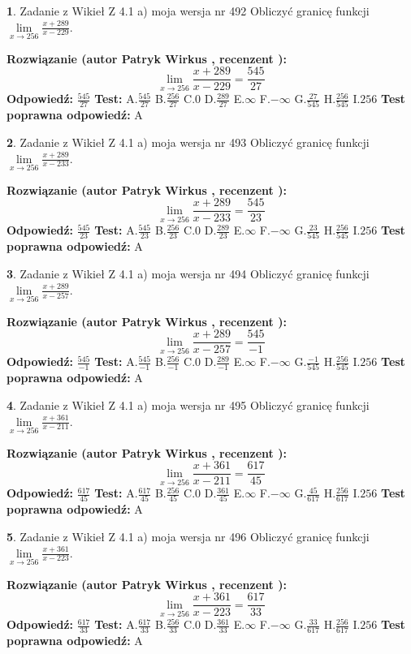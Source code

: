\documentclass[12pt, a4paper]{article}
\theoremstyle{definition} %
\newtheorem{zad}{}
\newcommand{\zadStart}[1]{\begin{zad}#1\newline}
\newcommand{\zadStop}{\end{zad}}
\newcommand{\rozwStart}[2]{\noindent \textbf{Rozwiązanie (autor #1 , recenzent #2): }\newline}
\newcommand{\rozwStop}{\newline}
\newcommand{\odpStart}{\noindent \textbf{Odpowiedź:}\newline}
\newcommand{\odpStop}{\newline}
\newcommand{\testStart}{\noindent \textbf{Test:}\newline}
\newcommand{\testStop}{\newline}
\newcommand{\kluczStart}{\noindent \textbf{Test poprawna odpowiedź:}\newline}
\newcommand{\kluczStop}{\newline}
\begin{document}
\zadStart{Zadanie z Wikieł Z 4.1 a) moja wersja nr 492}
Obliczyć granicę funkcji $\lim\limits_{x\to256}\frac{x+289}{x-229}$.
\zadStop
\rozwStart{Patryk Wirkus}{}
$$\lim\limits_{x\to256}\frac{x+289}{x-229} = \frac{545}{27}$$
\rozwStop
\odpStart
$\frac{545}{27}$
\odpStop
\testStart
A.$\frac{545}{27}$
B.$\frac{256}{27}$
C.$0$
D.$\frac{289}{27}$
E.$\infty$
F.$-\infty$
G.$\frac{27}{545}$
H.$\frac{256}{545}$
I.$256$
\testStop
\kluczStart
A
\kluczStop



\zadStart{Zadanie z Wikieł Z 4.1 a) moja wersja nr 493}
Obliczyć granicę funkcji $\lim\limits_{x\to256}\frac{x+289}{x-233}$.
\zadStop
\rozwStart{Patryk Wirkus}{}
$$\lim\limits_{x\to256}\frac{x+289}{x-233} = \frac{545}{23}$$
\rozwStop
\odpStart
$\frac{545}{23}$
\odpStop
\testStart
A.$\frac{545}{23}$
B.$\frac{256}{23}$
C.$0$
D.$\frac{289}{23}$
E.$\infty$
F.$-\infty$
G.$\frac{23}{545}$
H.$\frac{256}{545}$
I.$256$
\testStop
\kluczStart
A
\kluczStop



\zadStart{Zadanie z Wikieł Z 4.1 a) moja wersja nr 494}
Obliczyć granicę funkcji $\lim\limits_{x\to256}\frac{x+289}{x-257}$.
\zadStop
\rozwStart{Patryk Wirkus}{}
$$\lim\limits_{x\to256}\frac{x+289}{x-257} = \frac{545}{-1}$$
\rozwStop
\odpStart
$\frac{545}{-1}$
\odpStop
\testStart
A.$\frac{545}{-1}$
B.$\frac{256}{-1}$
C.$0$
D.$\frac{289}{-1}$
E.$\infty$
F.$-\infty$
G.$\frac{-1}{545}$
H.$\frac{256}{545}$
I.$256$
\testStop
\kluczStart
A
\kluczStop



\zadStart{Zadanie z Wikieł Z 4.1 a) moja wersja nr 495}
Obliczyć granicę funkcji $\lim\limits_{x\to256}\frac{x+361}{x-211}$.
\zadStop
\rozwStart{Patryk Wirkus}{}
$$\lim\limits_{x\to256}\frac{x+361}{x-211} = \frac{617}{45}$$
\rozwStop
\odpStart
$\frac{617}{45}$
\odpStop
\testStart
A.$\frac{617}{45}$
B.$\frac{256}{45}$
C.$0$
D.$\frac{361}{45}$
E.$\infty$
F.$-\infty$
G.$\frac{45}{617}$
H.$\frac{256}{617}$
I.$256$
\testStop
\kluczStart
A
\kluczStop



\zadStart{Zadanie z Wikieł Z 4.1 a) moja wersja nr 496}
Obliczyć granicę funkcji $\lim\limits_{x\to256}\frac{x+361}{x-223}$.
\zadStop
\rozwStart{Patryk Wirkus}{}
$$\lim\limits_{x\to256}\frac{x+361}{x-223} = \frac{617}{33}$$
\rozwStop
\odpStart
$\frac{617}{33}$
\odpStop
\testStart
A.$\frac{617}{33}$
B.$\frac{256}{33}$
C.$0$
D.$\frac{361}{33}$
E.$\infty$
F.$-\infty$
G.$\frac{33}{617}$
H.$\frac{256}{617}$
I.$256$
\testStop
\kluczStart
A
\kluczStop
\end{document}
